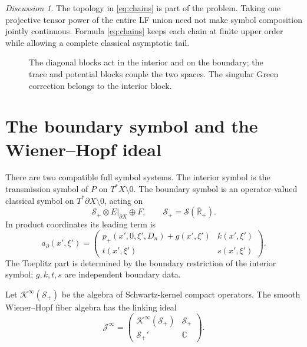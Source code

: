 \documentclass[11pt,oneside,reqno]{article}
\newcommand{\C}{\mathbb C}
\newcommand{\cJ}{\mathcal J}
\newcommand{\Splus}{\mathcal S_+}
\theoremstyle{plain}
\theoremstyle{definition}
\theoremstyle{remark}
\newtheorem*{discussion}{Discussion}
\begin{document}
\begin{discussion}
The topology in \eqref{eq:chains} is part of the problem. Taking one
projective tensor power of the entire LF union need not make symbol
composition jointly continuous. Formula \eqref{eq:chains} keeps each chain at
finite upper order while allowing a complete classical asymptotic tail.
\end{discussion}

\begin{figure}[htbp]
\centering
{}
\caption[Interior and boundary blocks]{The diagonal blocks act in the
interior and on the boundary; the trace and potential blocks couple the two
spaces. The singular Green correction belongs to the interior block.}
\end{figure}

\section{The boundary symbol and the Wiener--Hopf ideal}

There are two compatible full symbol systems. The interior symbol is the
transmission symbol of \(P\) on \(T^*X\setminus0\). The boundary symbol is an
operator-valued classical symbol on \(T^*\partial X\setminus0\), acting on
\[
 \Splus\otimes E|_{\partial X}\oplus F,
 \qquad \Splus=\mathcal S(\overline{\mathbb R}_+).
\]
In product coordinates its leading term is
\begin{equation}\label{eq:boundary-symbol}
 a_\partial(x',\xi')=
 \begin{pmatrix}
 p_+(x',0,\xi',D_n)+g(x',\xi')&k(x',\xi')\\
 t(x',\xi')&s(x',\xi')
 \end{pmatrix}.
\end{equation}
The Toeplitz part is determined by the boundary restriction of the interior
symbol; \(g,k,t,s\) are independent boundary data.

Let \(\mathcal K^\infty(\Splus)\) be the algebra of Schwartz-kernel compact
operators. The smooth Wiener--Hopf fiber algebra has the linking ideal
\begin{equation}\label{eq:linking}
 \cJ^\infty=
 \begin{pmatrix}
  \mathcal K^\infty(\Splus)&\Splus\\
  \Splus'&\C
 \end{pmatrix}.
\end{equation}
\end{document}

